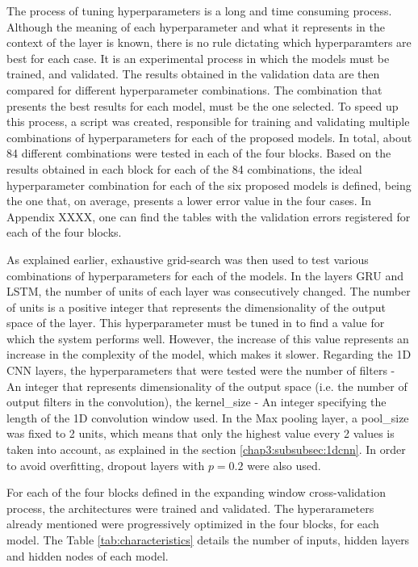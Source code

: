 The process of tuning hyperparameters is a long and time consuming process. Although the meaning of each hyperparameter and what it represents in the context of the layer is known, there is no rule dictating which hyperparamters are best for each case. It is an experimental process in which the models must be trained, and validated. The results obtained in the validation data are then compared for different hyperparameter combinations. The combination that presents the best results for each model, must be the one selected. To speed up this process, a script \cite{} was created, responsible for training and validating multiple combinations of hyperparameters for each of the proposed models. In total, about 84 different combinations were tested in each of the four blocks. Based on the results obtained in each block for each of the 84 combinations, the ideal hyperparameter combination for each of the six proposed models is defined, being the one that, on average, presents a lower error value in the four cases. In Appendix XXXX, one can find the tables with the validation errors registered for each of the four blocks.

As explained earlier, exhaustive grid-search was then used to test various combinations of hyperparameters for each of the models. In the layers \ac{GRU} and \ac{LSTM}, the number of units of each layer was consecutively changed.
The number of units is a positive integer that represents the dimensionality of the output space of the layer. This hyperparameter must be tuned in to find a value for which the system performs well. However, the increase of this value represents an increase in the complexity of the model, which makes it slower. Regarding the \ac{1D CNN} layers, the hyperparameters that were tested were the number of filters - An integer that represents dimensionality of the output space (i.e. the number of output filters in the convolution), the kernel\_size - An integer specifying the length of the 1D convolution window used. In the Max pooling layer, a pool\_size was fixed to 2 units, which means that only the highest value every 2 values is taken into account, as explained in the section \ref{chap3:subsubsec:1dcnn}. In order to avoid overfitting, dropout layers with $p=0.2$ were also used.

For each of the four blocks defined in the expanding window cross-validation process, the architectures were trained and validated. The hyperarameters already mentioned were progressively optimized in the four blocks, for each model. The Table \ref{tab:characteristics} details the number of inputs, hidden layers and hidden nodes of each model. 


